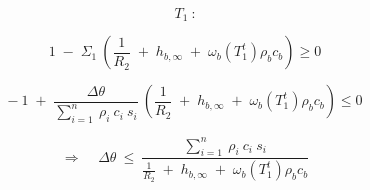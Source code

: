 \begin{adjustwidth}{0cm}{0cm}
	\begin{multicols}{3} %
		
		
		\hspace{-3cm}
		\begin{minipage}{\columnwidth}	
			\vspace{1cm}
			$$T_1 \: \mbox{:}$$ 
		\end{minipage}
		
		\columnbreak %
		
		
		\hspace{-5.5cm}
		\begin{minipage}{\columnwidth}	
			$$
			1 \;-\; \Sigma_1 \: \left(\frac{1}{R_2} \;+\; h_{b, \infty} \;+\; \omega_b (T_1^t) \rho_b c_b \right) \geq 0
			$$
			
			\vspace{-1cm}
			
			$$
			- \: 1 \;+\; \frac{\Delta \theta}{\sum_{i=1}^n \: \rho_i \: c_i \: s_i} \: \left(\frac{1}{R_2} \;+\; h_{b, \infty} \;+\; \omega_b (T_1^t) \rho_b c_b \right) \leq 0
			$$
			

		\end{minipage}
	
		\columnbreak
		
		\hspace{-1.5cm}
		\begin{minipage}{1.3\columnwidth}
			\vspace{0.7cm}
			$$
			\Rightarrow \;\;\;\; \Delta \theta \:\leq\: \frac{\sum_{i=1}^n \: \rho_i \: c_i \: s_i}{\frac{1}{R_2} \;+\; h_{b, \infty} \;+\; \omega_b (T_1^t) \rho_b c_b}
			$$
		\end{minipage}
		
	\end{multicols}
\end{adjustwidth}


